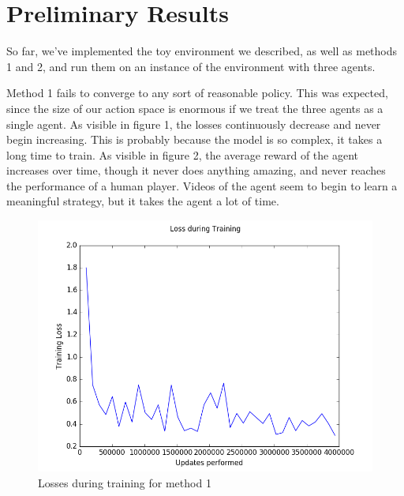 \documentclass{article}
\begin{document}
\section{Preliminary Results}

So far, we've implemented the toy environment we described, as well as methods
1 and 2, and run them on an instance of the environment with three agents.

Method 1 fails to converge to any sort of reasonable policy. This was expected,
since the size of our action space is enormous if we treat the three agents as a
single agent. As visible in figure 1, the losses continuously decrease and never
begin increasing. This is probably because the model is so complex, it takes a
long time to train. As visible in figure 2, the average reward of the agent
increases over time, though it never does anything amazing, and never reaches
the performance of a human player.
Videos of the agent seem to begin to learn a meaningful
strategy, but it takes the agent a lot of time.

\begin{figure}[H]
\centering
\includegraphics[scale=0.5]{dqn-training-loss}
\caption{Losses during training for method 1}
\end{figure}
\end{document}

